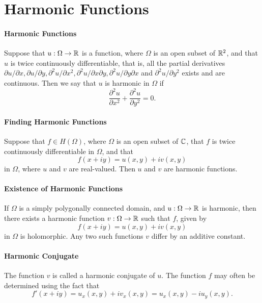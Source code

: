 \section{Harmonic Functions}
\paragraph{Harmonic Functions}
Suppose that \(u: \Omega \to \mathbb{R}\) is a function, where \(\Omega\) is an open subset of \(\mathbb{R}^2\), and that \(u\) is twice continuously differentiable, that is, all the partial derivatives \(\partial u / \partial x, \partial u / \partial y, \partial^2 u / \partial x^2, \partial^2 u / \partial x\partial y, \partial^2 u / \partial y\partial x\) and \(\partial^2 u / \partial y^2\) exists and are continuous. Then we say that \(u\) is harmonic in \(\Omega\) if
\[\frac{\partial^2 u}{\partial x^2} + \frac{\partial^2 u}{\partial y^2} = 0.\]

\paragraph{Finding Harmonic Functions}
Suppose that \(f \in H(\Omega)\), where \(\Omega\) is an open subset of \(\mathbb{C}\), that \(f\) is twice continuously differentiable in \(\Omega\), and that
\[f(x + iy) = u(x,y) + iv(x, y)\]
in \(\Omega\), where \(u\) and \(v\) are real-valued. Then \(u\) and \(v\) are harmonic functions.

\paragraph{Existence of Harmonic Functions}
If \(\Omega\) is a simply polygonally connected domain, and \(u: \Omega \to \mathbb{R}\) is harmonic, then there exists a harmonic function \(v: \Omega \to \mathbb{R}\) such that \(f\), given by
\[f(x + iy) = u(x, y) + iv(x, y)\]
in \(\Omega\) is holomorphic. Any two such functions \(v\) differ by an additive constant.

\paragraph{Harmonic Conjugate}
The function \(v\) is called a harmonic conjugate of \(u\). The function \(f\) may often be determined using the fact that
\[f'(x + iy) = u_x(x, y) + iv_x(x, y) = u_x(x, y) - iu_y(x, y).\]